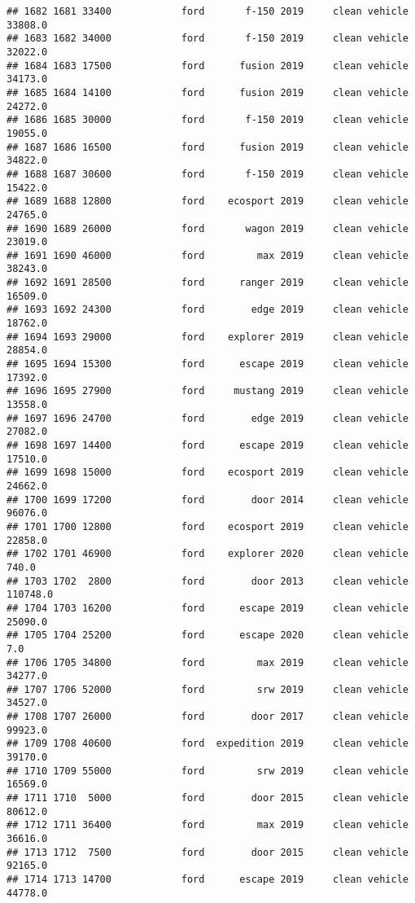 \documentclass[
]{article}
\begin{document}
\begin{verbatim}
## 1682 1681 33400            ford       f-150 2019     clean vehicle   33808.0
## 1683 1682 34000            ford       f-150 2019     clean vehicle   32022.0
## 1684 1683 17500            ford      fusion 2019     clean vehicle   34173.0
## 1685 1684 14100            ford      fusion 2019     clean vehicle   24272.0
## 1686 1685 30000            ford       f-150 2019     clean vehicle   19055.0
## 1687 1686 16500            ford      fusion 2019     clean vehicle   34822.0
## 1688 1687 30600            ford       f-150 2019     clean vehicle   15422.0
## 1689 1688 12800            ford    ecosport 2019     clean vehicle   24765.0
## 1690 1689 26000            ford       wagon 2019     clean vehicle   23019.0
## 1691 1690 46000            ford         max 2019     clean vehicle   38243.0
## 1692 1691 28500            ford      ranger 2019     clean vehicle   16509.0
## 1693 1692 24300            ford        edge 2019     clean vehicle   18762.0
## 1694 1693 29000            ford    explorer 2019     clean vehicle   28854.0
## 1695 1694 15300            ford      escape 2019     clean vehicle   17392.0
## 1696 1695 27900            ford     mustang 2019     clean vehicle   13558.0
## 1697 1696 24700            ford        edge 2019     clean vehicle   27082.0
## 1698 1697 14400            ford      escape 2019     clean vehicle   17510.0
## 1699 1698 15000            ford    ecosport 2019     clean vehicle   24662.0
## 1700 1699 17200            ford        door 2014     clean vehicle   96076.0
## 1701 1700 12800            ford    ecosport 2019     clean vehicle   22858.0
## 1702 1701 46900            ford    explorer 2020     clean vehicle     740.0
## 1703 1702  2800            ford        door 2013     clean vehicle  110748.0
## 1704 1703 16200            ford      escape 2019     clean vehicle   25090.0
## 1705 1704 25200            ford      escape 2020     clean vehicle       7.0
## 1706 1705 34800            ford         max 2019     clean vehicle   34277.0
## 1707 1706 52000            ford         srw 2019     clean vehicle   34527.0
## 1708 1707 26000            ford        door 2017     clean vehicle   99923.0
## 1709 1708 40600            ford  expedition 2019     clean vehicle   39170.0
## 1710 1709 55000            ford         srw 2019     clean vehicle   16569.0
## 1711 1710  5000            ford        door 2015     clean vehicle   80612.0
## 1712 1711 36400            ford         max 2019     clean vehicle   36616.0
## 1713 1712  7500            ford        door 2015     clean vehicle   92165.0
## 1714 1713 14700            ford      escape 2019     clean vehicle   44778.0

\end{verbatim}
\end{document}
